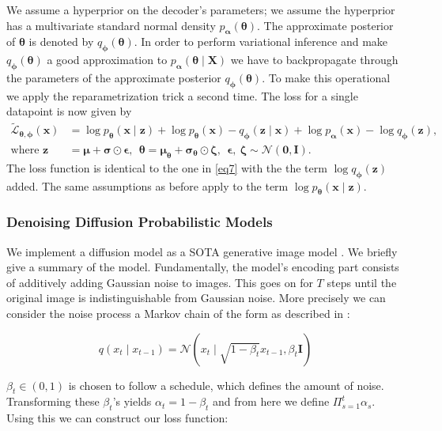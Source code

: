 We assume a hyperprior on the decoder's parameters; we assume the hyperprior has a multivariate standard normal density $p_{\bm{\alpha}}(\bm{\theta})$. 
The approximate posterior of $\bm{\theta}$ is denoted by $q_{\bm{\phi}}(\bm{\theta})$. 
In order to perform variational inference and make 
$q_{\bm{\phi}}(\bm{\theta})$ a good approximation to 
 $p_{\bm{\alpha}}(\bm{\theta} \mid \mathbf{X})$ we have to backpropagate through the parameters of the approximate posterior $q_{\bm{\phi}}(\bm{\theta})$. 
 To make this operational we apply the reparametrization trick a second time. 
The loss for a single datapoint is now given by 
\begin{align}
    \label{elbobayes}
	\tilde{\mathcal{L}}_{\bm{\theta}, \bm{\phi}}(\mathbf{x})
    &= 
	\log p_{\bm{\theta}}(\mathbf{x} \mid  \mathbf{z})
    + 
	\log p_{\bm{\theta}}(\mathbf{x})
    - 
	q_{\bm{\phi}}(\mathbf{z} \mid  \mathbf{x})
    + 
	\log p_{\bm{\alpha}}(\mathbf{x})
    - 
	\log q_{\bm{\phi}}(\mathbf{z}), \\ 
    \nonumber
	\text{where  }  
    \mathbf{z} & = \bm{\mu} + \bm{\sigma} \odot \bm{\epsilon}, \ \
    \bm{\theta} = \bm{\mu}_{\bm{\theta}} 
    + \bm{\sigma}_{\bm{\theta}} \odot \bm{\zeta} , \ \
	\bm{\epsilon}, \ \bm{\zeta}  \sim  \mathcal{N}(\bm{0}, \bm{I}).
\end{align}
The loss function is identical to the one in \eqref{eq7} 
with the the term
$\log q_{\bm{\phi}}(\mathbf{z})$
added. The same assumptions as before apply to the term $\log p_{\bm{\theta}}(\mathbf{x} \mid \mathbf{z})$.

\subsubsection*{Denoising Diffusion Probabilistic Models}
We implement a diffusion model as a SOTA generative image model \cite{diffusion2020}. We briefly give a summary of the model. Fundamentally, the model's encoding part consists of additively adding Gaussian noise to images. This goes on for $T$ steps until the original image is indistinguishable from Gaussian noise. More precisely we can consider the noise process a Markov chain of the form as described in \cite[p. 860, eq. 25.1]{pml2Book}:

\begin{equation}
    q(x_t \mid x_{t-1}) = \mathcal{N}(x_t \mid \sqrt{1 - \beta_t} x_{t-1}, \beta_t\mathbf{I})
\end{equation}

$\beta_t \in (0, 1)$ is chosen to follow a schedule, which defines the amount of noise. Transforming these $\beta_t$'s yields $\alpha_t = 1 - \beta_t$ and from here we define $ \Pi_{s=1}^t \alpha_s$. Using this we can construct our loss function:

